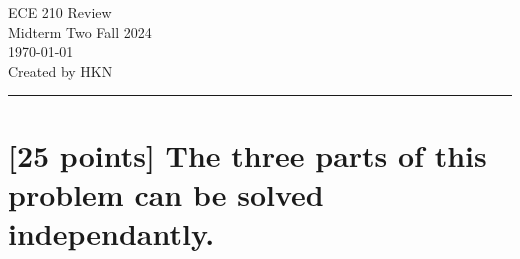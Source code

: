 \documentclass[12pt,letterpaper, onecolumn]{exam}
\begin{document}
\begingroup  
    \centering
    \LARGE ECE 210 Review\\
    \LARGE Midterm Two Fall 2024\\[0.5em]
    \large \today\\[0.5em]
    \large Created by HKN\par
\endgroup
\rule{\textwidth}{0.4pt}
\pointsdroppedatright   %
\printanswers
\renewcommand{\solutiontitle}{\noindent\textbf{}\enspace}   %

\newcommand\myNIA[4]{%
    \draw #2 coordinate(#1-in) to[short] ++(1,0)
    node[op amp, noinv input up, anchor=+](#1-OA){\texttt{#1}}
    (#1-OA.-) -- ++(0,-1) coordinate(#1-FB)
    to[R=#3] ++(0,-2) node[ground]{}
    (#1-FB) to[R=#4, *-] (#1-FB -| #1-OA.out) -- (#1-OA.out)
    to [short, *-] ++(1,0) coordinate(#1-out)
    ;
}


\section{[25 points] The three parts of this problem can be solved independantly.}
\end{document}
